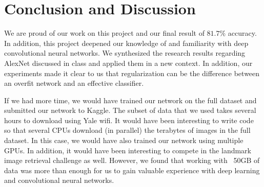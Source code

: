 \section{Conclusion and Discussion}
We are proud of our work on this project and our final result of $81.7\%$ accuracy. In addition, this project deepened our knowledge of and familiarity with deep convolutional neural networks. We synthesized the research results regarding AlexNet discussed in class and applied them in a new context. In addition, our experiments made it clear to us that regularization can be the difference between an overfit network and an effective classifier.

If we had more time, we would have trained our network on the full dataset and submitted our network to Kaggle. The subset of data that we used takes several hours to download using Yale wifi. It would have been interesting to  write code so that several CPUs download (in parallel) the terabytes of images in the full dataset. In this case, we would have also trained our network using multiple GPUs. In addition, it would have been interesting to compete in the landmark image retrieval challenge as well. However, we found that working with ~50GB of data was more than enough for us to gain valuable experience with deep learning and convolutional neural networks.